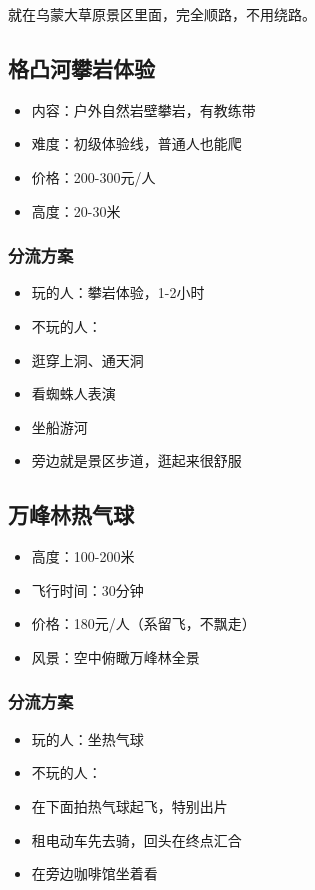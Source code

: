 \documentclass[12pt,a4paper,UTF8]{ctexart}
\begin{document}
就在乌蒙大草原景区里面，完全顺路，不用绕路。

\subsection{格凸河攀岩体验}
\begin{itemize}
\item 内容：户外自然岩壁攀岩，有教练带
\item 难度：初级体验线，普通人也能爬
\item 价格：200-300元/人
\item 高度：20-30米
\end{itemize}

\subsubsection{分流方案}
\begin{itemize}
\item 玩的人：攀岩体验，1-2小时
\item 不玩的人：
\item 逛穿上洞、通天洞
\item 看蜘蛛人表演
\item 坐船游河
\item 旁边就是景区步道，逛起来很舒服
\end{itemize}

\subsection{万峰林热气球}
\begin{itemize}
\item 高度：100-200米
\item 飞行时间：30分钟
\item 价格：180元/人（系留飞，不飘走）
\item 风景：空中俯瞰万峰林全景
\end{itemize}

\subsubsection{分流方案}
\begin{itemize}
\item 玩的人：坐热气球
\item 不玩的人：
\item 在下面拍热气球起飞，特别出片
\item 租电动车先去骑，回头在终点汇合
\item 在旁边咖啡馆坐着看
\end{itemize}
\end{document}
